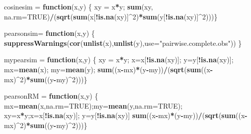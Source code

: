 \documentclass[]{article}
\newenvironment{Shaded}{\begin{snugshade}}{\end{snugshade}}
\newcommand{\ControlFlowTok}[1]{\textcolor[rgb]{0.13,0.29,0.53}{\textbf{#1}}}
\newcommand{\DataTypeTok}[1]{\textcolor[rgb]{0.13,0.29,0.53}{#1}}
\newcommand{\DecValTok}[1]{\textcolor[rgb]{0.00,0.00,0.81}{#1}}
\newcommand{\KeywordTok}[1]{\textcolor[rgb]{0.13,0.29,0.53}{\textbf{#1}}}
\newcommand{\NormalTok}[1]{#1}
\newcommand{\OperatorTok}[1]{\textcolor[rgb]{0.81,0.36,0.00}{\textbf{#1}}}
\newcommand{\OtherTok}[1]{\textcolor[rgb]{0.56,0.35,0.01}{#1}}
\newcommand{\StringTok}[1]{\textcolor[rgb]{0.31,0.60,0.02}{#1}}
\begin{document}
\begin{Shaded}
\begin{Highlighting}[]
\NormalTok{cosinesim =}\StringTok{ }\ControlFlowTok{function}\NormalTok{(x,y) \{ xy =}\StringTok{ }\NormalTok{x}\OperatorTok{*}\NormalTok{y; }\KeywordTok{sum}\NormalTok{(xy, }\DataTypeTok{na.rm=}\OtherTok{TRUE}\NormalTok{)}\OperatorTok{/}\NormalTok{(}\KeywordTok{sqrt}\NormalTok{(}\KeywordTok{sum}\NormalTok{(x[}\OperatorTok{!}\KeywordTok{is.na}\NormalTok{(xy)]}\OperatorTok{^}\DecValTok{2}\NormalTok{)}\OperatorTok{*}\KeywordTok{sum}\NormalTok{(y[}\OperatorTok{!}\KeywordTok{is.na}\NormalTok{(xy)]}\OperatorTok{^}\DecValTok{2}\NormalTok{)))\}}

\NormalTok{pearsonsim=}\StringTok{ }\ControlFlowTok{function}\NormalTok{(x,y) \{ }\KeywordTok{suppressWarnings}\NormalTok{(}\KeywordTok{cor}\NormalTok{(}\KeywordTok{unlist}\NormalTok{(x),}\KeywordTok{unlist}\NormalTok{(y),}\DataTypeTok{use=}\StringTok{"pairwise.complete.obs"}\NormalTok{)) \}}

\NormalTok{mypearsim =}\StringTok{ }\ControlFlowTok{function}\NormalTok{(x,y) \{ xy =}\StringTok{ }\NormalTok{x}\OperatorTok{*}\NormalTok{y; x=x[}\OperatorTok{!}\KeywordTok{is.na}\NormalTok{(xy)]; y=y[}\OperatorTok{!}\KeywordTok{is.na}\NormalTok{(xy)]; }
\NormalTok{                            mx=}\KeywordTok{mean}\NormalTok{(x); my=}\KeywordTok{mean}\NormalTok{(y);}
                            \KeywordTok{sum}\NormalTok{((x}\OperatorTok{-}\NormalTok{mx)}\OperatorTok{*}\NormalTok{(y}\OperatorTok{-}\NormalTok{my))}\OperatorTok{/}\NormalTok{(}\KeywordTok{sqrt}\NormalTok{(}\KeywordTok{sum}\NormalTok{((x}\OperatorTok{-}\NormalTok{mx)}\OperatorTok{^}\DecValTok{2}\NormalTok{)}\OperatorTok{*}\KeywordTok{sum}\NormalTok{((y}\OperatorTok{-}\NormalTok{my)}\OperatorTok{^}\DecValTok{2}\NormalTok{)))\}}

\NormalTok{pearsonRM =}\StringTok{ }\ControlFlowTok{function}\NormalTok{(x,y) \{ mx=}\KeywordTok{mean}\NormalTok{(x,}\DataTypeTok{na.rm=}\OtherTok{TRUE}\NormalTok{);my=}\KeywordTok{mean}\NormalTok{(y,}\DataTypeTok{na.rm=}\OtherTok{TRUE}\NormalTok{);}
\NormalTok{                            xy=x}\OperatorTok{*}\NormalTok{y;x=x[}\OperatorTok{!}\KeywordTok{is.na}\NormalTok{(xy)]; y=y[}\OperatorTok{!}\KeywordTok{is.na}\NormalTok{(xy)]}
                            \KeywordTok{sum}\NormalTok{((x}\OperatorTok{-}\NormalTok{mx)}\OperatorTok{*}\NormalTok{(y}\OperatorTok{-}\NormalTok{my))}\OperatorTok{/}\NormalTok{(}\KeywordTok{sqrt}\NormalTok{(}\KeywordTok{sum}\NormalTok{((x}\OperatorTok{-}\NormalTok{mx)}\OperatorTok{^}\DecValTok{2}\NormalTok{)}\OperatorTok{*}\KeywordTok{sum}\NormalTok{((y}\OperatorTok{-}\NormalTok{my)}\OperatorTok{^}\DecValTok{2}\NormalTok{)))\}}


\end{Highlighting}
\end{Shaded}
\end{document}
